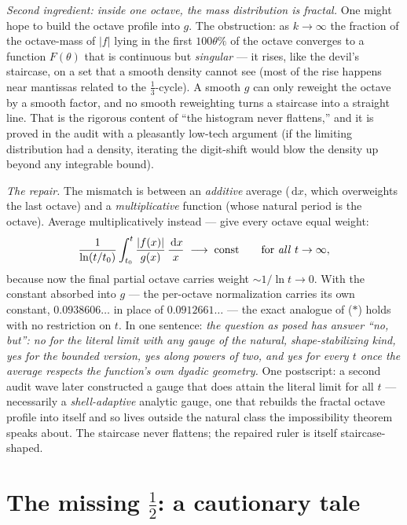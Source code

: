 \documentclass[11pt,oneside]{article}
\theoremstyle{remark}
\newcommand{\dd}{\,\mathrm d}
\begin{document}
\emph{Second ingredient: inside one octave, the mass distribution is
fractal.}  One might hope to build the octave profile into $g$.  The
obstruction: as $k\to\infty$ the fraction of the octave-mass of
$|f|$ lying in the first $100\theta\%$ of the octave converges to a
function $F(\theta)$ that is continuous but \emph{singular} --- it
rises, like the devil's staircase, on a set that a smooth density
cannot see (most of the rise happens near mantissas related to the
$\tfrac13$-cycle).  A smooth $g$ can only reweight the octave by a
smooth factor, and no smooth reweighting turns a staircase into a
straight line.  That is the rigorous content of ``the histogram never
flattens,'' and it is proved in the audit with a pleasantly low-tech
argument (if the limiting distribution had a density, iterating the
digit-shift would blow the density up beyond any integrable bound).

\emph{The repair.}  The mismatch is between an \emph{additive} average
($\dd x$, which overweights the last octave) and a
\emph{multiplicative} function (whose natural period is the octave).
Average multiplicatively instead --- give every octave equal weight:
\[
 \frac{1}{\ln(t/t_0)}\int_{t_0}^{t}\frac{|f(x)|}{g(x)}\,
 \frac{\dd x}{x}
 \;\longrightarrow\;\text{const}
 \qquad\text{for \emph{all} } t\to\infty,
\]
because now the final partial octave carries weight
$\sim1/\ln t\to0$.  With the constant absorbed into $g$ --- the
per-octave normalization carries its own constant,
$0.0938606\ldots$ in place of $0.0912661\ldots$ --- the exact
analogue of ($\ast$) holds with no restriction on $t$.  In one
sentence: \emph{the question as posed has answer ``no, but'': no for
the literal limit with any gauge of the natural, shape-stabilizing
kind, yes for the bounded version, yes along powers of two, and yes
for every $t$ once the average respects the function's own dyadic
geometry.}  One postscript: a second audit wave later constructed a
gauge that does attain the literal limit for all $t$ --- necessarily a
\emph{shell-adaptive} analytic gauge, one that rebuilds the fractal
octave profile into itself and so lives outside the natural class the
impossibility theorem speaks about.  The staircase never flattens;
the repaired ruler is itself staircase-shaped.

\section{The missing \texorpdfstring{$\tfrac12$}{1/2}: a cautionary tale}
\label{sec:half}
\end{document}
